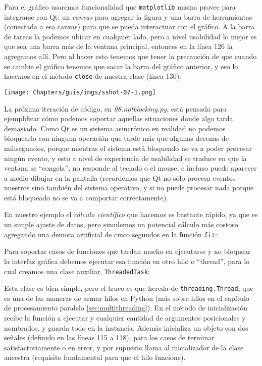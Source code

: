 Para el gráfico usaremos funcionalidad que \texttt{matplotlib} misma provee para integrarse con Qt: un \textit{canvas} para agregar la figura y una barra de herramientas (conectada a esa canvas) para que se pueda interactuar con el gráfico. A la barra de tareas la podemos ubicar en cualquier lado, pero a nivel usabilidad lo mejor es que sea una barra más de la ventana principal, entonces en la línea 126 la agregamos allí. Pero al hacer esto tenemos que tener la precaución de que cuando se cambie el gráfico tenemos que sacar la barra del gráfico anterior, y eso lo hacemos en el método \texttt{close} de nuestra clase (línea 130).

\begin{center}
    \texttt{[image: Chapters/guis/imgs/sshot-07-1.png]}
\end{center}

La próxima iteración de código, en \textit{08.notblocking.py}, está pensada para ejemplificar cómo podemos soportar aquellas situaciones donde algo tarda demasiado. Como Qt es un sistema asincrónico en realidad no podemos bloquearlo con ninguna operación que tarde más que algunas decenas de milisegundos, porque mientras el sistema está bloqueado no va a poder procesar ningún evento, y esto a nivel de experiencia de usabilidad se traduce en que la ventana se ``congela'', no responde al teclado o el mouse, e incluso puede aparecer a medio dibujar en la pantalla (recordemos que Qt no sólo procesa eventos nuestros sino también del sistema operativo, y si no puede procesar nada porque está bloqueado no se va a comportar correctamente).

En nuestro ejemplo el \textit{cálculo científico} que hacemos es bastante rápido, ya que es un simple ajuste de datos, pero simulemos un potencial cálculo más costoso agregando una demora artificial de cinco segundos en la función \texttt{fit}:


Para soportar casos de funciones que tardan mucho en ejecutarse y no bloquear la interfaz gráfica debemos ejecutar esa función en otro hilo o ``thread'', para lo cual creamos una clase auxiliar, \texttt{ThreadedTask}:


Esta clase es bien simple, pero el truco es que hereda de \texttt{threading.Thread}, que es una de las maneras de armar hilos en Python (más sobre hilos en el capítulo de procesamiento paralelo \ref{sec:multithreading}). En el método de inicialización recibe la función a ejecutar y cualquier cantidad de argumentos posicionales y nombrados, y guarda todo en la instancia. Además inicializa un objeto con dos señales (definido en las líneas 115 a 118), para los casos de terminar satisfactoriamente o en error, y por supuesto llama al inicializador de la clase ancestra (requisito fundamental para que el hilo funcione).


